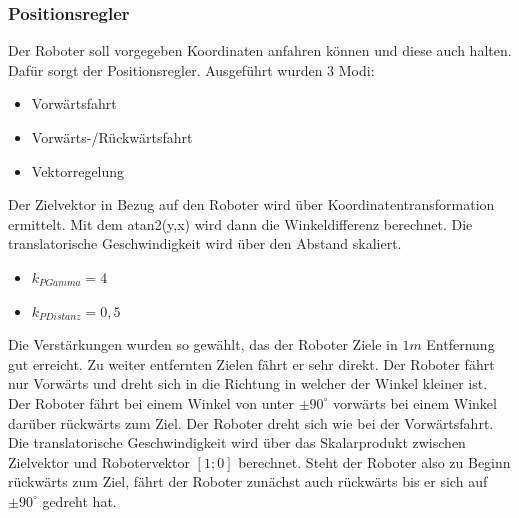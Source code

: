 \subsubsection{Positionsregler}
Der Roboter soll vorgegeben Koordinaten anfahren können und  diese auch halten. Dafür sorgt der Positionsregler. Ausgeführt wurden 3 Modi:
\begin{itemize}
	\item Vorwärtsfahrt
	\item Vorwärts-/Rückwärtsfahrt
	\item Vektorregelung
\end{itemize}

Der Zielvektor in Bezug auf den Roboter wird über Koordinatentransformation ermittelt. Mit dem atan2(y,x) wird dann die Winkeldifferenz berechnet. Die translatorische Geschwindigkeit wird über den Abstand skaliert.
\begin{itemize}
	\item $k_{PGamma} = 4$
	\item $k_{PDistanz} = 0,5$
\end{itemize}
Die Verstärkungen wurden so gewählt, das der Roboter Ziele in $1m$ Entfernung gut erreicht. Zu weiter entfernten Zielen fährt er sehr direkt.
Der Roboter fährt nur Vorwärts und dreht sich in die Richtung in welcher der Winkel kleiner ist.
Der Roboter fährt bei einem Winkel von unter $\pm90^{\circ}$ vorwärts bei einem Winkel darüber rückwärts zum Ziel.
Der Roboter dreht sich wie bei der Vorwärtsfahrt. Die translatorische Geschwindigkeit wird über das Skalarprodukt zwischen Zielvektor und Robotervektor $[1;0]$ berechnet. Steht der Roboter also zu Beginn rückwärts zum Ziel, fährt der Roboter zunächst auch rückwärts bis er sich auf $\pm90^{\circ}$ gedreht hat.


\newpage
